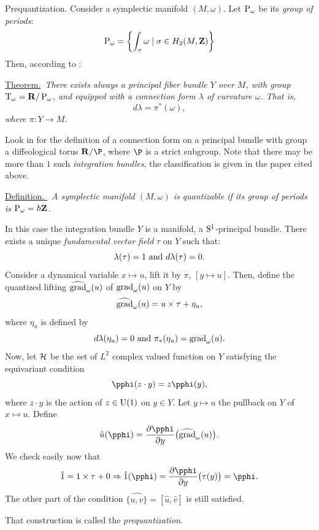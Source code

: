 \begin{Article}{Prequantization.}
  Consider a symplectic manifold $(M,\omega)$.
  Let $\operatorname{P}_\omega$ be its \emph{group of periods}:
  $$%
    \Periods_\omega = \left\{ \int_\sigma \omega \mid \sigma \in H_2(M,\ZZ) \right\}
    $$%
  Then,
  according to  \cite{PIZ95}:
  
  \uline{Theorem.}~{\itshape There exists always a principal fiber bundle $Y$ over $M$,
  with group $\mathrm{T}_\omega = \mathbf{R}/\operatorname{P}_\omega$,
  and equipped with a connection form $\lambda$ of curvature $\omega$.
  That is,
  $$%
    d\lambda = \pi^*(\omega),
    $$%
  where $\pi \colon Y \to M$.
  }
  
  Look in \cite[\textsection\,8.37]{PIZ13} for the definition of a connection form on a principal bundle with group a diffeological torus $\RR/\P$,
  where $\P$ is a strict subgroup.
  Note that there may be more than $1$ such \emph{integration bundles},
  the classification is given in the paper cited above.
  
  \uline{Definition. \cite{Sou70}}~{\itshape A symplectic manifold $(M,\omega)$ is \emph{quantizable} if its group of periods is $\operatorname{P}_\omega = \hbar\mathbf{Z}$.}
  
  In this case the integration bundle $Y$ is a manifold,
  a $\mathrm{S}^1$-principal bundle.
  There exists a unique \emph{fundamental vector field} $\tau$ on $Y$ such that:
  $$%
    \lambda (\tau) = 1
    \SpacedText{and}
    d\lambda(\tau) = 0.
    $$%
  Consider a dynamical variable $x \mapsto u$,
  lift it by $\pi$,
  $[y \mapsto u]$.
  Then,
  define the quantized lifting $\widehat{\operatorname{grad}}_\omega(u)$ of $\operatorname{grad}_\omega(u)$ on $Y$ by
  $$%
    \widehat\grad_\omega(u) = u \times \tau + \eta_u,
    $$%
  where $\eta_u$ is defined by
  $$%
    d\lambda(\eta_u) = 0
    \SpacedText{and}
    \pi_*(\eta_u) = \grad_\omega(u).
    $$%
  Now,
  let $\mathcal{H}$ be the set of $L^2$ complex valued function on $Y$ satisfying the equivariant condition
  $$%
    \pphi(z\cdot y) = z \pphi(y),
    $$%
  where $z\cdot y$ is the action of $z \in \mathrm{U}(1)$ on $y \in Y$.
  Let $y \mapsto u$ the pullback on $Y$ of $x \mapsto u$.
  Define
  $$%
    \hat u(\pphi) = {\partial \pphi \over \partial y}\big(\widehat\grad_\omega(u)\big).
    $$%
  We check easily now that
  $$%
    \hat 1 = 1 \times \tau + 0 \Rightarrow \hat 1(\pphi) = {\partial \pphi \over \partial y}\big(\tau(y)\big) = \pphi.
    $$%
  The other part of the condition $\widehat{\{u,v\}} = [\hat u, \hat v]$ is still satisfied.
  
  That construction is called the \emph{prequantization}.
\end{Article}

